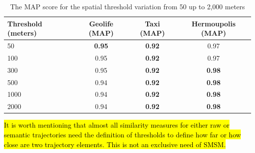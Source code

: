 \documentclass[12pt]{article}
\begin{document}
\begin{table}[ht!]
  \scriptsize
  \centering
  \begin{tabular}{|l|c|c|c|}
  	\hline
Threshold (meters) & Geolife (MAP) & Taxi (MAP) & Hermoupolis (MAP)\\
  	\hline
50 & \textbf{0.95} & \textbf{0.92} & 0.97\\
100 & 0.95 & \textbf{0.92}  & 0.97\\
300 & 0.95 & \textbf{0.92}  & \textbf{0.98} \\
500 & 0.94 & \textbf{0.92} & \textbf{0.98}\\
1000 & 0.94 & \textbf{0.92} & \textbf{0.98}\\
2000 & 0.94 & \textbf{0.92} & \textbf{0.98}\\
    \hline
  \end{tabular}
  \caption{The MAP score for the spatial threshold variation from 50 up to 2,000 meters}
  \label{tab:sensibility_spatial_thresholds}
\end{table}


\hl{It is worth mentioning that almost all similarity measures for either raw or semantic trajectories need the definition of thresholds to define how far or how close are two trajectory elements. This is not an exclusive need of SMSM. }
\end{document}
